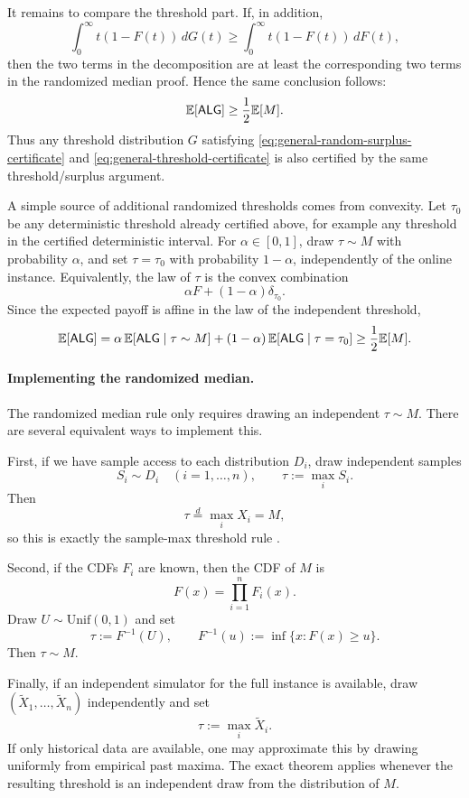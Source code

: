 It remains to compare the threshold part. If, in addition,
\begin{equation}
\int_0^\infty t(1-F(t))\,dG(t)
\ge
\int_0^\infty t(1-F(t))\,dF(t),
\label{eq:general-threshold-certificate}
\end{equation}
then the two terms in the decomposition are at least the corresponding two terms in the randomized median proof. Hence the same conclusion follows:
\[
\mathbb{E}[\mathsf{ALG}]\ge \frac12\mathbb{E}[M].
\]
Thus any threshold distribution $G$ satisfying \eqref{eq:general-random-surplus-certificate} and \eqref{eq:general-threshold-certificate} is also certified by the same threshold/surplus argument.

A simple source of additional randomized thresholds comes from convexity. Let $\tau_0$ be any deterministic threshold already certified above, for example any threshold in the certified deterministic interval. For $\alpha\in[0,1]$, draw $\tau\sim M$ with probability $\alpha$, and set $\tau=\tau_0$ with probability $1-\alpha$, independently of the online instance. Equivalently, the law of $\tau$ is the convex combination
\[
\alpha F+(1-\alpha)\delta_{\tau_0}.
\]
Since the expected payoff is affine in the law of the independent threshold,
\[
\mathbb{E}[\mathsf{ALG}]
=
\alpha\,\mathbb{E}[\mathsf{ALG}\mid \tau\sim M]
+
(1-\alpha)\,\mathbb{E}[\mathsf{ALG}\mid \tau=\tau_0]
\ge
\frac12\mathbb{E}[M].
\]

\paragraph{Implementing the randomized median.}
The randomized median rule only requires drawing an independent $\tau\sim M$. There are several equivalent ways to implement this.

First, if we have sample access to each distribution $D_i$, draw independent samples
\[
S_i\sim D_i \quad (i=1,\ldots,n),
\qquad
\tau:=\max_i S_i.
\]
Then
\[
\tau\overset{d}=\max_i X_i=M,
\]
so this is exactly the sample-max threshold rule \cite{rubinsteinwangweinberg2020samples}.

Second, if the CDFs $F_i$ are known, then the CDF of $M$ is
\[
F(x)=\prod_{i=1}^n F_i(x).
\]
Draw $U\sim \mathrm{Unif}(0,1)$ and set
\[
\tau:=F^{-1}(U),
\qquad
F^{-1}(u):=\inf\{x:F(x)\ge u\}.
\]
Then $\tau\sim M$.

Finally, if an independent simulator for the full instance is available, draw $(\widetilde X_1,\ldots,\widetilde X_n)$ independently and set
\[
\tau:=\max_i \widetilde X_i.
\]
If only historical data are available, one may approximate this by drawing uniformly from empirical past maxima. The exact theorem applies whenever the resulting threshold is an independent draw from the distribution of $M$.

